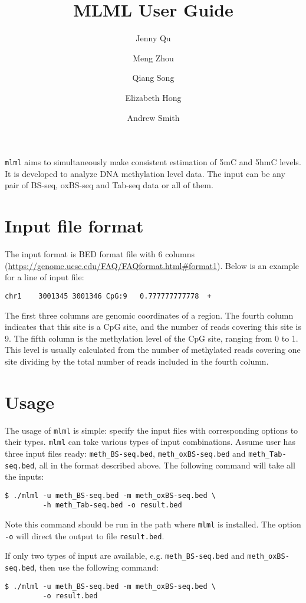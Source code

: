 \documentclass[11pt]{article}
\title{MLML User Guide}
\author{Jenny Qu \and Meng Zhou \and Qiang Song \and Elizabeth Hong \and Andrew Smith}
\newcommand{\prog}[1]{\texttt{#1}}
\newcommand{\fn}[1]{\texttt{#1}}
\newcommand{\op}[1]{\texttt{#1}}
\begin{document}
\maketitle

\prog{mlml} aims to simultaneously make consistent estimation of 5mC and 5hmC levels. It is developed to analyze DNA methylation level data. The input can be any pair of BS-seq, oxBS-seq and Tab-seq data or all of them.

\section{Input file format}
The input format is BED format file with 6 columns (\url{https://genome.ucsc.edu/FAQ/FAQformat.html\#format1}). Below is an example for a line of input file:
\begin{verbatim}
chr1    3001345 3001346 CpG:9   0.777777777778  +
\end{verbatim}

\noindent
The first three columns are genomic coordinates of a region. The fourth column indicates that this site is a CpG site, and the number of reads covering this site is 9. The fifth column is the methylation level of the CpG site, ranging from 0 to 1. This level is usually calculated from the number of methylated reads covering one site dividing by the total number of reads included in the fourth column.

\section{Usage}
The usage of \prog{mlml} is simple: specify the input files with corresponding options to their types. \prog{mlml} can take various types of input combinations. Assume user has three input files ready: \fn{meth\_BS-seq.bed}, \fn{meth\_oxBS-seq.bed} and \fn{meth\_Tab-seq.bed}, all in the format described above. The following command will take all the inputs:
\begin{verbatim}
$ ./mlml -u meth_BS-seq.bed -m meth_oxBS-seq.bed \
         -h meth_Tab-seq.bed -o result.bed
\end{verbatim}
Note this command should be run in the path where \prog{mlml} is installed. The option \op{-o} will direct the output to file \fn{result.bed}.

If only two types of input are available, e.g. \fn{meth\_BS-seq.bed} and \fn{meth\_oxBS-seq.bed}, then use the following command:
\begin{verbatim}
$ ./mlml -u meth_BS-seq.bed -m meth_oxBS-seq.bed \
         -o result.bed
\end{verbatim}
\end{document}
